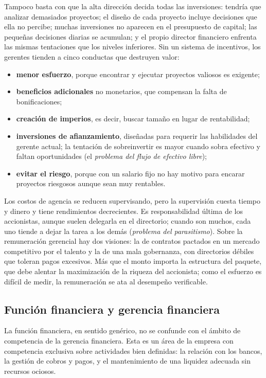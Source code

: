 Tampoco basta con que la alta dirección decida todas las inversiones: tendría que analizar demasiados proyectos; el diseño de cada proyecto incluye decisiones que ella no percibe; muchas inversiones no aparecen en el presupuesto de capital; las pequeñas decisiones diarias se acumulan; y el propio director financiero enfrenta las mismas tentaciones que los niveles inferiores. Sin un sistema de incentivos, los gerentes tienden a cinco conductas que destruyen valor:
\begin{itemize}
\item \textbf{menor esfuerzo}, porque encontrar y ejecutar proyectos valiosos es exigente;
\item \textbf{beneficios adicionales} no monetarios, que compensan la falta de bonificaciones;
\item \textbf{creación de imperios}, es decir, buscar tamaño en lugar de rentabilidad;
\item \textbf{inversiones de afianzamiento}, diseñadas para requerir las habilidades del gerente actual; la tentación de sobreinvertir es mayor cuando sobra efectivo y faltan oportunidades (el \emph{problema del flujo de efectivo libre});
\item \textbf{evitar el riesgo}, porque con un salario fijo no hay motivo para encarar proyectos riesgosos aunque sean muy rentables.
\end{itemize}

Los costos de agencia se reducen supervisando, pero la supervisión cuesta tiempo y dinero y tiene rendimientos decrecientes. Es responsabilidad última de los accionistas, aunque suelen delegarla en el directorio; cuando son muchos, cada uno tiende a dejar la tarea a los demás (\emph{problema del parasitismo}). Sobre la remuneración gerencial hay dos visiones: la de contratos pactados en un mercado competitivo por el talento y la de una mala gobernanza, con directorios débiles que toleran pagos excesivos. Más que el monto importa la estructura del paquete, que debe alentar la maximización de la riqueza del accionista; como el esfuerzo es difícil de medir, la remuneración se ata al desempeño verificable.

\subsection{Función financiera y gerencia financiera}

La función financiera, en sentido genérico, no se confunde con el ámbito de competencia de la gerencia financiera. Esta es un área de la empresa con competencia exclusiva sobre actividades bien definidas: la relación con los bancos, la gestión de cobros y pagos, y el mantenimiento de una liquidez adecuada sin recursos ociosos.

